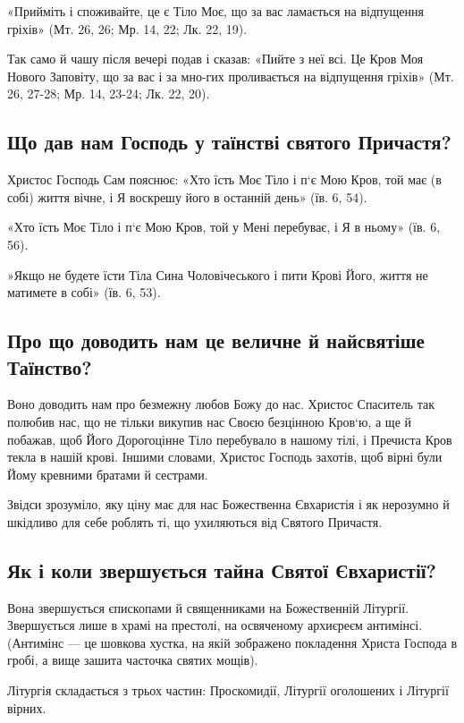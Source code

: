 \documentclass[main.tex]{subfiles}
\begin{document}
«Прийміть і споживайте, це є Тіло Моє, що за вас ламається на відпущення гріхів» (Мт. 26, 26; Мр. 14, 22; Лк. 22, 19).

Так само й чашу після вечері подав і сказав: «Пийте з неї всі. Це Кров Моя Нового Заповіту, що за вас і за мно-гих проливається на відпущення гріхів» (Мт. 26, 27-28; Мр. 14, 23-24; Лк. 22, 20).

\subsection{Що дав нам Господь у таїнстві святого Причастя?}

Христос Господь Сам пояснює: «Хто їсть Моє Тіло і п`є Мою Кров, той має (в собі) життя вічне, і Я воскрешу його в останній день» (їв. 6, 54).

«Хто їсть Моє Тіло і п`є Мою Кров, той у Мені перебуває, і Я в ньому» (їв. 6, 56).

»Якщо не будете їсти Тіла Сина Чоловічеського і пити Крові Його, життя не матимете в собі» (їв. 6, 53).

\subsection{Про що доводить нам це величне й найсвятіше Таїнство?}

Воно доводить нам про безмежну любов Божу до нас. Христос Спаситель так полюбив нас, що не тільки викупив нас Своєю безцінною Кров`ю, а ще й побажав, щоб Його Дорогоцінне Тіло перебувало в нашому тілі, і Пречиста Кров текла в нашій крові. Іншими словами, Христос Господь захотів, щоб вірні були Йому кревними братами й сестрами.

Звідси зрозуміло, яку ціну має для нас Божественна Євхаристія і як нерозумно й шкідливо для себе роблять ті, що ухиляються від Святого Причастя.

\subsection{Як і коли звершується тайна Святої Євхаристії?}

Вона звершується єпископами й священниками на Божественній Літургії. Звершується лише в храмі на престолі, на освяченому архиєреєм антимінсі. (Антимінс — це шовкова хустка, на якій зображено покладення Христа Господа в гробі, а вище зашита часточка святих мощів).

Літургія складається з трьох частин: Проскомидії, Літургії оголошених і Літургії вірних.
\end{document}
